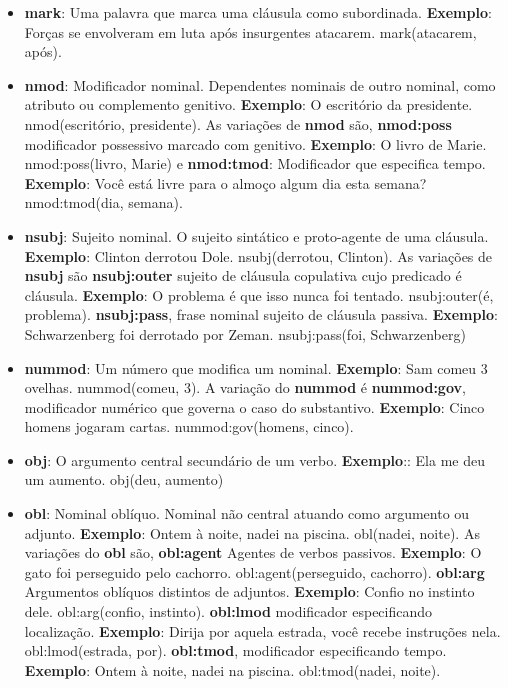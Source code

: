 \begin{itemize}
\item\textbf{mark}: Uma palavra que marca uma cláusula como subordinada. \textbf{Exemplo}: Forças se envolveram em luta após insurgentes atacarem. mark(atacarem, após).

\item\textbf{nmod}: Modificador nominal. Dependentes nominais de outro nominal, como atributo ou complemento genitivo. \textbf{Exemplo}: O escritório da presidente. nmod(escritório, presidente). As variações de \textbf{nmod} são, \textbf{nmod:poss} modificador possessivo marcado com genitivo. \textbf{Exemplo}: O livro de Marie. nmod:poss(livro, Marie) e \textbf{nmod:tmod}: Modificador que especifica tempo. \textbf{Exemplo}: Você está livre para o almoço algum dia esta semana? nmod:tmod(dia, semana).

\item\textbf{nsubj}: Sujeito nominal. O sujeito sintático e proto-agente de uma cláusula. \textbf{Exemplo}: Clinton derrotou Dole. nsubj(derrotou, Clinton). As variações de \textbf{nsubj} são \textbf{nsubj:outer} sujeito de cláusula copulativa cujo predicado é cláusula. \textbf{Exemplo}: O problema é que isso nunca foi tentado. nsubj:outer(é, problema). \textbf{nsubj:pass}, frase nominal sujeito de cláusula passiva. \textbf{Exemplo}: Schwarzenberg foi derrotado por Zeman. nsubj:pass(foi, Schwarzenberg)

\item\textbf{nummod}: Um número que modifica um nominal. \textbf{Exemplo}: Sam comeu 3 ovelhas. nummod(comeu, 3). A variação do \textbf{nummod} é \textbf{nummod:gov}, modificador numérico que governa o caso do substantivo. \textbf{Exemplo}: Cinco homens jogaram cartas. nummod:gov(homens, cinco).

\item\textbf{obj}: O argumento central secundário de um verbo. \textbf{Exemplo}:: Ela me deu um aumento. obj(deu, aumento)

\item\textbf{obl}: Nominal oblíquo. Nominal não central atuando como argumento ou adjunto. \textbf{Exemplo}: Ontem à noite, nadei na piscina. obl(nadei, noite). As variações do \textbf{obl} são, \textbf{obl:agent} Agentes de verbos passivos.  \textbf{Exemplo}: O gato foi perseguido pelo cachorro. obl:agent(perseguido, cachorro). \textbf{obl:arg} Argumentos oblíquos distintos de adjuntos. \textbf{Exemplo}: Confio no instinto dele. obl:arg(confio, instinto). \textbf{obl:lmod} modificador especificando localização. \textbf{Exemplo}: Dirija por aquela estrada, você recebe instruções nela. obl:lmod(estrada, por). \textbf{obl:tmod}, modificador especificando tempo. \textbf{Exemplo}: Ontem à noite, nadei na piscina. obl:tmod(nadei, noite).


\end{itemize}
